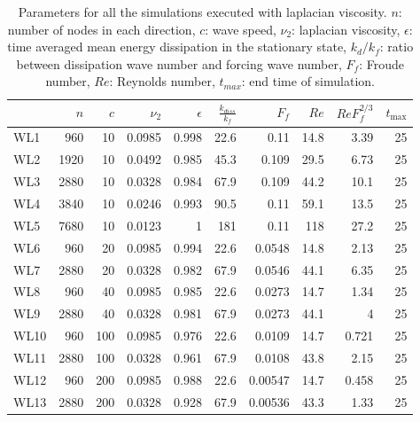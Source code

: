 \begin{table}
\begin{center}

\label{Table2}

\begin{tabular}{lrrrrrrrrr}
\toprule
{} &  $n$ &  $c$ &  $\nu_2$ &  $\epsilon$ &  $\frac{k_{diss}}{k_f}$ &   $F_f$ &  $Re$ &  $ReF_f^{2/3}$ &  $t_{\max}$ \\
\midrule
WL1  &  960 &   10 &   0.0985 &       0.998 &                    22.6 &    0.11 &  14.8 &           3.39 &          25 \\
WL2  & 1920 &   10 &   0.0492 &       0.985 &                    45.3 &   0.109 &  29.5 &           6.73 &          25 \\
WL3  & 2880 &   10 &   0.0328 &       0.984 &                    67.9 &   0.109 &  44.2 &           10.1 &          25 \\
WL4  & 3840 &   10 &   0.0246 &       0.993 &                    90.5 &    0.11 &  59.1 &           13.5 &          25 \\
WL5  & 7680 &   10 &   0.0123 &           1 &                     181 &    0.11 &   118 &           27.2 &          25 \\
WL6  &  960 &   20 &   0.0985 &       0.994 &                    22.6 &  0.0548 &  14.8 &           2.13 &          25 \\
WL7  & 2880 &   20 &   0.0328 &       0.982 &                    67.9 &  0.0546 &  44.1 &           6.35 &          25 \\
WL8  &  960 &   40 &   0.0985 &       0.985 &                    22.6 &  0.0273 &  14.7 &           1.34 &          25 \\
WL9  & 2880 &   40 &   0.0328 &       0.981 &                    67.9 &  0.0273 &  44.1 &              4 &          25 \\
WL10 &  960 &  100 &   0.0985 &       0.976 &                    22.6 &  0.0109 &  14.7 &          0.721 &          25 \\
WL11 & 2880 &  100 &   0.0328 &       0.961 &                    67.9 &  0.0108 &  43.8 &           2.15 &          25 \\
WL12 &  960 &  200 &   0.0985 &       0.988 &                    22.6 & 0.00547 &  14.7 &          0.458 &          25 \\
WL13 & 2880 &  200 &   0.0328 &       0.928 &                    67.9 & 0.00536 &  43.3 &           1.33 &          25 \\
\bottomrule
\end{tabular}

\caption{Parameters for all the simulations executed with laplacian viscosity.
$ n $: number of nodes in each direction, $ c $: wave speed, $ \nu_2 $: laplacian viscosity, $ \epsilon $: time
averaged mean energy dissipation in the stationary state, $ k_{d}/ k_f $: ratio
between dissipation wave number and forcing wave number, $F_f $: Froude
number, $Re$: Reynolds number, $ t_{max} $: end time of simulation.}
\end{center}
\end{table}

